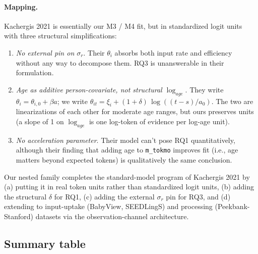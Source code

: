 \documentclass[11pt]{article}
\begin{document}
\paragraph{Mapping.} Kachergis 2021 is essentially our M3 / M4 fit,
but in standardized logit units with three structural simplifications:
\begin{enumerate}[leftmargin=1.3em]
\item \emph{No external pin on \(\sigma_r\)}. Their \(\theta_i\)
absorbs both input rate and efficiency without any way to decompose
them. RQ3 is unanswerable in their formulation.
\item \emph{Age as additive person-covariate, not structural
\(\log_{age}\)}. They write \(\theta_i = \theta_{i,0} + \beta a\); we
write \(\theta_{it} = \xi_i + (1 + \delta)\,\log\!((t-s)/a_0)\).
The two are linearizations of each other for moderate age ranges,
but ours preserves units (a slope of 1 on \(\log_{age}\) is one
log-token of evidence per log-age unit).
\item \emph{No acceleration parameter}. Their model can't pose RQ1
quantitatively, although their finding that adding age to
\texttt{m\_tokmo} improves fit (i.e., age matters beyond expected
tokens) is qualitatively the same conclusion.
\end{enumerate}
Our nested family completes the standard-model program of Kachergis
2021 by (a) putting it in real token units rather than standardized
logit units, (b) adding the structural \(\delta\) for RQ1, (c)
adding the external \(\sigma_r\) pin for RQ3, and (d) extending to
input-uptake (BabyView, SEEDLingS) and processing (Peekbank-Stanford)
datasets via the observation-channel architecture.

\subsection*{Summary table}
\end{document}
